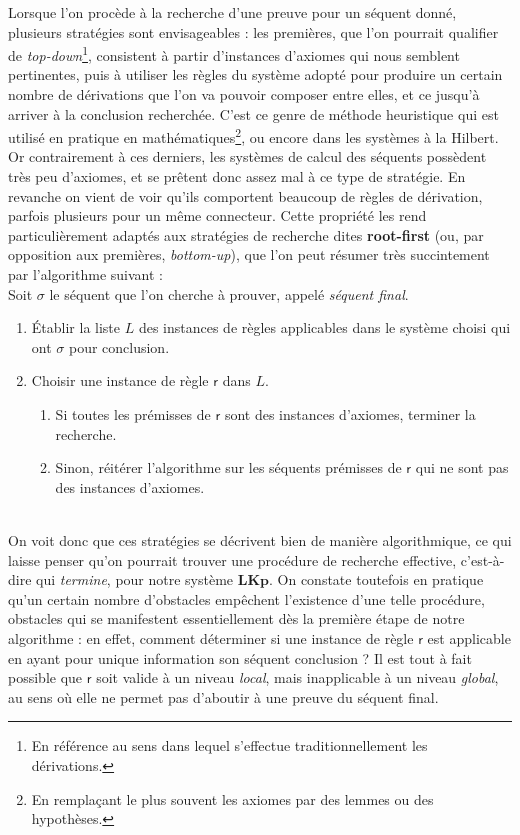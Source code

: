 \documentclass[11pt]{report}
\begin{document}
Lorsque l'on procède à la recherche d'une preuve pour un séquent donné, plusieurs stratégies sont envisageables : les premières, que l'on pourrait qualifier de \emph{top-down}\footnote{En référence au sens dans lequel s'effectue traditionnellement les dérivations.}, consistent à partir d'instances d'axiomes qui nous semblent pertinentes, puis à utiliser les règles du système adopté pour produire un certain nombre de dérivations que l'on va pouvoir composer entre elles, et ce jusqu'à arriver à la conclusion recherchée. C'est ce genre de méthode heuristique qui est utilisé en pratique en mathématiques\footnote{En remplaçant le plus souvent les axiomes par des lemmes ou des hypothèses.}, ou encore dans les systèmes à la Hilbert. Or contrairement à ces derniers, les systèmes de calcul des séquents possèdent très peu d'axiomes, et se prêtent donc assez mal à ce type de stratégie. En revanche on vient de voir qu'ils comportent beaucoup de règles de dérivation, parfois plusieurs pour un même connecteur. Cette propriété les rend particulièrement adaptés aux stratégies de recherche dites \textbf{root-first} (ou, par opposition aux premières, \emph{bottom-up}), que l'on peut résumer très succintement par l'algorithme suivant :\\

Soit $\sigma$ le séquent que l'on cherche à prouver, appelé \emph{séquent final}.
\begin{enumerate}
    \item Établir la liste $L$ des instances de règles applicables dans le système choisi qui ont $\sigma$ pour conclusion.
    \item Choisir une instance de règle $\mathsf{r}$ dans $L$.
        \begin{enumerate}
            \item Si toutes les prémisses de $\mathsf{r}$ sont des instances d'axiomes, terminer la recherche.
            \item Sinon, réitérer l'algorithme sur les séquents prémisses de $\mathsf{r}$ qui ne sont pas des instances d'axiomes.
        \end{enumerate}
\end{enumerate}
~\\
On voit donc que ces stratégies se décrivent bien de manière algorithmique, ce qui laisse penser qu'on pourrait trouver une procédure de recherche effective, c'est-à-dire qui \emph{termine}, pour notre système $\mathbf{LKp}$. On constate toutefois en pratique qu'un certain nombre d'obstacles empêchent l'existence d'une telle procédure, obstacles qui se manifestent essentiellement dès la première étape de notre algorithme : en effet, comment déterminer si une instance de règle $\mathsf{r}$ est applicable en ayant pour unique information son séquent conclusion ? Il est tout à fait possible que $\mathsf{r}$ soit valide à un niveau \emph{local}, mais inapplicable à un niveau \emph{global}, au sens où elle ne permet pas d'aboutir à une preuve du séquent final.\\
\end{document}

